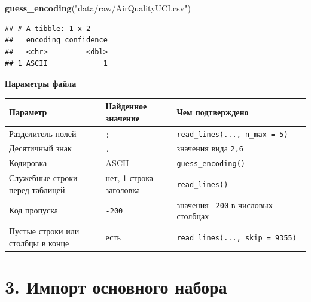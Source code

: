 \documentclass[
]{article}
\newenvironment{Shaded}{\begin{snugshade}}{\end{snugshade}}
\newcommand{\FunctionTok}[1]{\textcolor[rgb]{0.13,0.29,0.53}{\textbf{#1}}}
\newcommand{\NormalTok}[1]{#1}
\newcommand{\StringTok}[1]{\textcolor[rgb]{0.31,0.60,0.02}{#1}}
\newcounter{none} %
\begin{document}
\begin{Shaded}
\begin{Highlighting}[]
\FunctionTok{guess\_encoding}\NormalTok{(}\StringTok{"data/raw/AirQualityUCI.csv"}\NormalTok{)}
\end{Highlighting}
\end{Shaded}

\begin{verbatim}
## # A tibble: 1 x 2
##   encoding confidence
##   <chr>         <dbl>
## 1 ASCII             1
\end{verbatim}

\textbf{Параметры файла}

{\def\LTcaptype{none} %
\begin{longtable}[]{@{}
  >{\raggedright\arraybackslash}p{}
  >{\raggedright\arraybackslash}p{}
  >{\raggedright\arraybackslash}p{}@{}}
\toprule\noalign{}
\begin{minipage}[b]{\linewidth}\raggedright
Параметр
\end{minipage} & \begin{minipage}[b]{\linewidth}\raggedright
Найденное значение
\end{minipage} & \begin{minipage}[b]{\linewidth}\raggedright
Чем подтверждено
\end{minipage} \\
\midrule\noalign{}
\endhead
\bottomrule\noalign{}
\endlastfoot
Разделитель полей & \texttt{;} &
\texttt{read\_lines(...,\ n\_max\ =\ 5)} \\
Десятичный знак & \texttt{,} & значения вида \texttt{2,6} \\
Кодировка & ASCII & \texttt{guess\_encoding()} \\
Служебные строки перед таблицей & нет, 1 строка заголовка &
\texttt{read\_lines()} \\
Код пропуска & \texttt{-200} & значения \texttt{-200} в числовых
столбцах \\
Пустые строки или столбцы в конце & есть &
\texttt{read\_lines(...,\ skip\ =\ 9355)} \\
\end{longtable}
}

\section{3. Импорт основного
набора}\label{ux438ux43cux43fux43eux440ux442-ux43eux441ux43dux43eux432ux43dux43eux433ux43e-ux43dux430ux431ux43eux440ux430}
\end{document}
